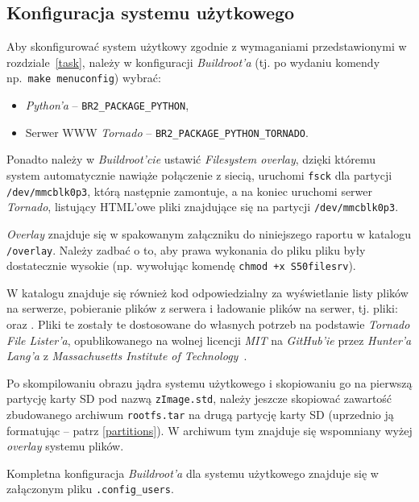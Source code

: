 \documentclass{article}
\begin{document}

\subsection{Konfiguracja systemu użytkowego}

Aby skonfigurować system użytkowy zgodnie z wymaganiami przedstawionymi w rozdziale~\ref{task}, należy w konfiguracji \emph{Buildroot'a} (tj. po wydaniu komendy np.~\texttt{make menuconfig}) wybrać:
\begin{itemize}
	\item \emph{Python'a} -- \texttt{BR2\_PACKAGE\_PYTHON},
	\item Serwer WWW \emph{Tornado} -- \texttt{BR2\_PACKAGE\_PYTHON\_TORNADO}.
\end{itemize}
Ponadto należy w \emph{Buildroot'cie} ustawić \emph{Filesystem overlay}, dzięki któremu system automatycznie nawiąże połączenie z siecią, uruchomi \texttt{fsck} dla partycji \texttt{/dev/mmcblk0p3}, którą następnie zamontuje, a na koniec uruchomi serwer \emph{Tornado}, listujący HTML'owe pliki znajdujące się na partycji \texttt{/dev/mmcblk0p3}.

\emph{Overlay} znajduje się w spakowanym załączniku do niniejszego raportu w katalogu \texttt{/overlay}. Należy zadbać o to, aby prawa wykonania do pliku  pliku były dostatecznie wysokie (np. wywołując komendę \texttt{chmod +x S50filesrv}).

W katalogu  znajduje się również kod odpowiedzialny za wyświetlanie listy plików na serwerze, pobieranie plików z serwera i ładowanie plików na serwer, tj. pliki:  oraz . Pliki te zostały te dostosowane do własnych potrzeb na podstawie \emph{Tornado File Lister'a}, opublikowanego na wolnej licencji \emph{MIT} na \emph{GitHub'ie} przez \emph{Hunter'a Lang'a} z \emph{Massachusetts Institute of Technology}~\cite{www:file-lister,www:mit_license}.

Po skompilowaniu obrazu jądra systemu użytkowego i skopiowaniu go na pierwszą partycję karty SD pod nazwą \texttt{zImage.std}, należy jeszcze skopiować zawartość zbudowanego archiwum \texttt{rootfs.tar} na drugą partycję karty SD (uprzednio ją formatując -- patrz \ref{partitions}). W archiwum tym znajduje się wspomniany wyżej \emph{overlay} systemu plików.

Kompletna konfiguracja \emph{Buildroot'a} dla systemu użytkowego znajduje się w załączonym pliku \texttt{.config\_users}.
\end{document}
